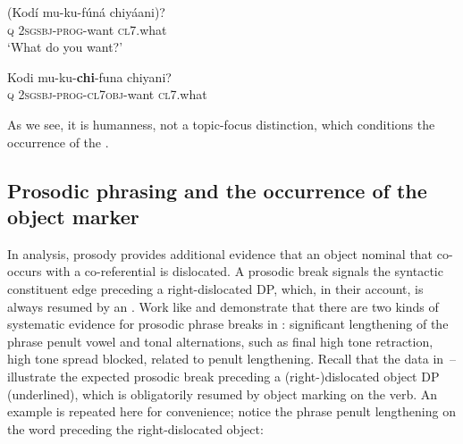 \documentclass[output=paper]{LSP/langsci}
\begin{document}
\begin{exe}
\ex
\label{02-do-ex:27}%
\begin{xlist}

\ex \label{02-do-ex:27a}%
\gll (Kodí 	mu-ku-fúná 		chiyáani)?\\
	\textsc{q}	\textsc{2sgsbj}-\textsc{prog}-want	\textsc{cl7}.what\\
\glt ‘What do you want?’

\ex \label{02-do-ex:27b}%
\gll *Kodi mu-ku-\textbf{chi}-funa 				chiyani?\\
	\textsc{q} \textsc{2sgsbj}-\textsc{prog}-\textsc{cl7obj}-want	\textsc{cl7}.what\\

\end{xlist}
\end{exe}

As we see, it is humanness, not a topic-focus distinction, which conditions the occurrence of the .

\subsection{Prosodic phrasing and the occurrence of the object marker}
\label{Downing-Prosodic}
In  analysis, prosody provides additional evidence that an object nominal that co-occurs with a co-referential  is dislocated. A prosodic break signals the syntactic constituent edge preceding a right-dislocated DP, which, in their account, is always resumed by an . Work like \citet{Bresnanetal1987Topic} and \citet{Kanerva1990Focus} demonstrate that there are two kinds of systematic evidence for prosodic phrase breaks in : significant lengthening of the phrase penult vowel and tonal alternations, such as final high tone retraction, high tone spread blocked, related to penult lengthening.
Recall that the  data in~-- illustrate the expected prosodic break preceding a (right-)dislocated object DP (underlined), which is obligatorily resumed by object marking on the verb. An example is repeated here for convenience; notice the phrase penult lengthening on the word preceding the right-dislocated object:
\end{document}

